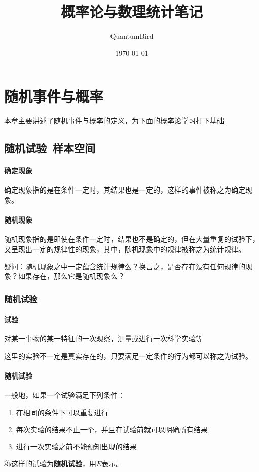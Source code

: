 \documentclass[UTF8]{ctexart}
\title{概率论与数理统计笔记}
\author{QuantumBird}
\date{\today}
\begin{document}
	\maketitle
	\tableofcontents
	\section{随机事件与概率}
	本章主要讲述了随机事件与概率的定义，为下面的概率论学习打下基础
	\subsection{随机试验\ 样本空间}
		\paragraph{确定现象}
		确定现象指的是在条件一定时，其结果也是一定的，这样的事件被称之为确定现象。
		\paragraph{随机现象}
		随机现象指的是即使在条件一定时，结果也不是确定的，但在大量重复的试验下，又呈现出一定的规律性的现象，其中，随机现象中的规律被称之为统计规律。

		疑问：随机现象之中一定蕴含统计规律么？换言之，是否存在没有任何规律的现象？如果存在，那么它是随机现象么？
		\subsubsection{随机试验}
		\paragraph{试验} 对某一事物的某一特征的一次观察，测量或进行一次科学实验等
		
		这里的实验不一定是真实存在的，只要满足一定条件的行为都可以称之为试验。
		\paragraph{随机试验}一般地，如果一个试验满足下列条件：
		\begin{enumerate}
			\item 在相同的条件下可以重复进行
			\item 每次实验的结果不止一个，并且在试验前就可以明确所有结果
			\item 进行一次实验之前不能预知出现的结果
		\end{enumerate}
		称这样的试验为\textbf{随机试验}，用$E$表示。
		
\end{document}
